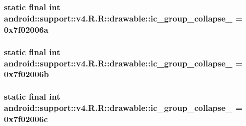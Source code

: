 \hypertarget{classandroid_1_1support_1_1v4_1_1_r_1_1drawable_a7faf650f6c37957d8541c7b2a8aedc7}{
\subsubsection[{ic\_\-group\_\-collapse\_\-11}]{\setlength{\rightskip}{0pt plus 5cm}static final int android::support::v4.R.R::drawable::ic\_\-group\_\-collapse\_ = 0x7f02006a}}
\label{classandroid_1_1support_1_1v4_1_1_r_1_1drawable_a7faf650f6c37957d8541c7b2a8aedc7}


\hypertarget{classandroid_1_1support_1_1v4_1_1_r_1_1drawable_32ee0e3c09fc59b2ede453fe57d07266}{
\subsubsection[{ic\_\-group\_\-collapse\_\-12}]{\setlength{\rightskip}{0pt plus 5cm}static final int android::support::v4.R.R::drawable::ic\_\-group\_\-collapse\_ = 0x7f02006b}}
\label{classandroid_1_1support_1_1v4_1_1_r_1_1drawable_32ee0e3c09fc59b2ede453fe57d07266}


\hypertarget{classandroid_1_1support_1_1v4_1_1_r_1_1drawable_097c44a52cfe30853873554f48c765cb}{
\subsubsection[{ic\_\-group\_\-collapse\_\-13}]{\setlength{\rightskip}{0pt plus 5cm}static final int android::support::v4.R.R::drawable::ic\_\-group\_\-collapse\_ = 0x7f02006c}}
\label{classandroid_1_1support_1_1v4_1_1_r_1_1drawable_097c44a52cfe30853873554f48c765cb}



